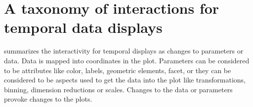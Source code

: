 \documentclass[12pt]{article}
\providecommand{\tabularnewline}{\\}
\begin{document}
% 



\section{A taxonomy of interactions for temporal data displays\label{sec:Design-of-interactions}}

\citet{wills2012visualizing} summarizes
the interactivity for temporal displays as changes to parameters or data. Data is mapped into coordinates in the plot. Parameters can be considered to be attributes like color, labels, geometric elements, facet, or they can be considered to be aspects used to get the data into the plot like transformations, binning, dimension reductions or scales. Changes to the data or parameters provoke changes to the plots. 
\end{document}
